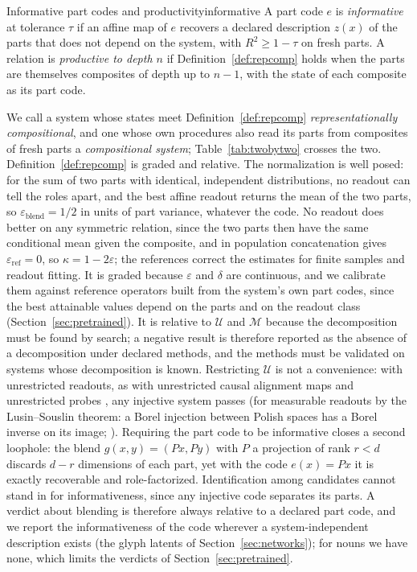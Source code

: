 \documentclass[10pt]{article}
\theoremstyle{plain}
\theoremstyle{remark}
\newcommand{\U}{\mathcal{U}}
\newcommand{\M}{\mathcal{M}}
\begin{document}
\begin{defbox}{Informative part codes and productivity}{informative}
A part code $e$ is \emph{informative} at tolerance $\tau$ if an affine map of $e$ recovers a declared description $z(x)$ of the parts that does not depend on the system, with $R^2 \ge 1 - \tau$ on fresh parts. A relation is \emph{productive to depth $n$} if Definition~\ref{def:repcomp} holds when the parts are themselves composites of depth up to $n - 1$, with the state of each composite as its part code.
\end{defbox}

We call a system whose states meet Definition~\ref{def:repcomp} \emph{representationally compositional}, and one whose own procedures also read its parts from composites of fresh parts a \emph{compositional system}; Table~\ref{tab:twobytwo} crosses the two. Definition~\ref{def:repcomp} is graded and relative. The normalization is well posed: for the sum of two parts with identical, independent distributions, no readout can tell the roles apart, and the best affine readout returns the mean of the two parts, so $\varepsilon_{\mathrm{blend}} = 1/2$ in units of part variance, whatever the code. No readout does better on any symmetric relation, since the two parts then have the same conditional mean given the composite, and in population concatenation gives $\varepsilon_{\mathrm{ref}} = 0$, so $\kappa = 1 - 2\varepsilon$; the references correct the estimates for finite samples and readout fitting. It is graded because $\varepsilon$ and $\delta$ are continuous, and we calibrate them against reference operators built from the system's own part codes, since the best attainable values depend on the parts and on the readout class (Section~\ref{sec:pretrained}). It is relative to $\U$ and $\M$ because the decomposition must be found by search; a negative result is therefore reported as the absence of a decomposition under declared methods, and the methods must be validated on systems whose decomposition is known. Restricting $\U$ is not a convenience: with unrestricted readouts, as with unrestricted causal alignment maps \citep{sutter2025} and unrestricted probes \citep{hewitt2019}, any injective system passes (for measurable readouts by the Lusin--Souslin theorem: a Borel injection between Polish spaces has a Borel inverse on its image; \citealt[Theorem~15.1]{kechris1995}). Requiring the part code to be informative closes a second loophole: the blend $g(x, y) = (Px, Py)$ with $P$ a projection of rank $r < d$ discards $d - r$ dimensions of each part, yet with the code $e(x) = Px$ it is exactly recoverable and role-factorized. Identification among candidates cannot stand in for informativeness, since any injective code separates its parts. A verdict about blending is therefore always relative to a declared part code, and we report the informativeness of the code wherever a system-independent description exists (the glyph latents of Section~\ref{sec:networks}); for nouns we have none, which limits the verdicts of Section~\ref{sec:pretrained}.
\end{document}
